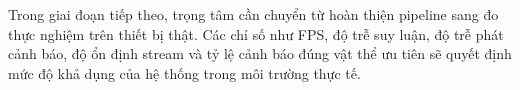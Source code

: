 \documentclass[oneside,final]{hcmut-report}
\begin{document}
Trong giai đoạn tiếp theo, trọng tâm cần chuyển từ hoàn thiện pipeline sang đo thực nghiệm trên thiết bị thật. Các chỉ số như FPS, độ trễ suy luận, độ trễ phát cảnh báo, độ ổn định stream và tỷ lệ cảnh báo đúng vật thể ưu tiên sẽ quyết định mức độ khả dụng của hệ thống trong môi trường thực tế.



\end{document}
